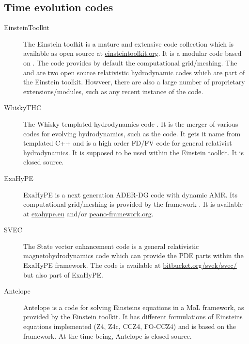 \begin{fullwidth}
\subsection{Time evolution codes}\label{apx.codes.time-evolution}
\begin{description}
	\item[EinsteinToolkit] The Einstein toolkit is a mature and extensive code
	  collection which is available as open source at
	  \href{https://einsteintoolkit.org/}{einsteintoolkit.org}. It is a modular
	  code based on . The  code 
	    \cite{Schnetter-etal-03b, Schnetter:2006pg,Goodale02a} 
	  provides by default the computational grid/meshing. The 
	  and  are two open source relativistic hydrodynamic
	  codes which are part of the Einstein toolkit. Howveer, there are also
	  a large number of proprietary extensions/modules, such as any recent
	  instance of the  code.
	\item[WhiskyTHC] The Whisky templated hydrodynamics code
	  \cite{Radice2013,Radice2011}. It is the merger of various codes for
	  evolving hydrodynamics, such as the  code. It gets it
	  name from templated C++ and is a high order FD/FV code for general
	  relativist hydrodynamics. It is supposed to be used within the
	  Einstein toolkit. It is closed source.
	\item[ExaHyPE] ExaHyPE is a next generation ADER-DG code with dynamic AMR.
      Its computational grid/meshing is provided by the 
      framework \cite{Peano1,Peano2}.
      It is available at \href{http://exahype.eu/}{exahype.eu} and/or
	  \href{http://www.peano-framework.org/}{peano-framework.org}.
	
	\item[SVEC] The State vector enhancement code is a general relativistic
	  magnetohydrodynamics code which can provide the PDE parts within the
	  ExaHyPE framework. The code is available at
	  \href{https://bitbucket.org/svek/svec/}{bitbucket.org/svek/svec/}
	  but also part of ExaHyPE.
	  
	\item[Antelope] Antelope is a code for solving Einsteins equations in a
	  MoL framework, as provided by the Einstein toolkit. It has different
	  formulations of Einsteins equations implemented
	  (Z4, Z4c, CCZ4, FO-CCZ4) and is based on the 
	  framework. At the time being, Antelope is closed source.
\end{description}
	

\end{fullwidth}
